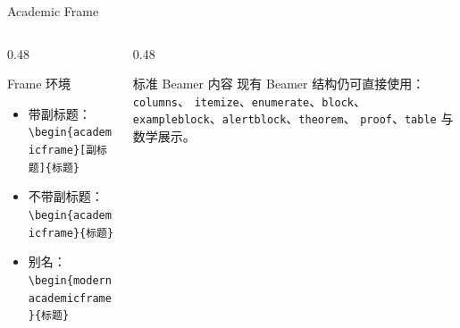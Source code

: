 \documentclass[aspectratio=169,10pt]{ctexbeamer}
\begin{document}
\begin{academicframe}[普通页面构造方式]{Academic Frame}
  \begin{columns}[T,onlytextwidth]
    \begin{column}{0.48\textwidth}
      \begin{block}{Frame 环境}
        \scriptsize
        \begin{itemize}
          \item 带副标题：
            \texttt{\textbackslash begin\{academicframe\}[副标题]\{标题\}}
          \item 不带副标题：
            \texttt{\textbackslash begin\{academicframe\}\{标题\}}
          \item 别名：
            \texttt{\textbackslash begin\{modernacademicframe\}\{标题\}}
        \end{itemize}
      \end{block}
    \end{column}
    \begin{column}{0.48\textwidth}
      \begin{exampleblock}{标准 Beamer 内容}
        \scriptsize
        现有 Beamer 结构仍可直接使用：\texttt{columns}、
        \texttt{itemize}、\texttt{enumerate}、\texttt{block}、
        \texttt{exampleblock}、\texttt{alertblock}、\texttt{theorem}、
        \texttt{proof}、\texttt{table} 与数学展示。
      \end{exampleblock}
    \end{column}
  \end{columns}
\end{academicframe}
\end{document}

